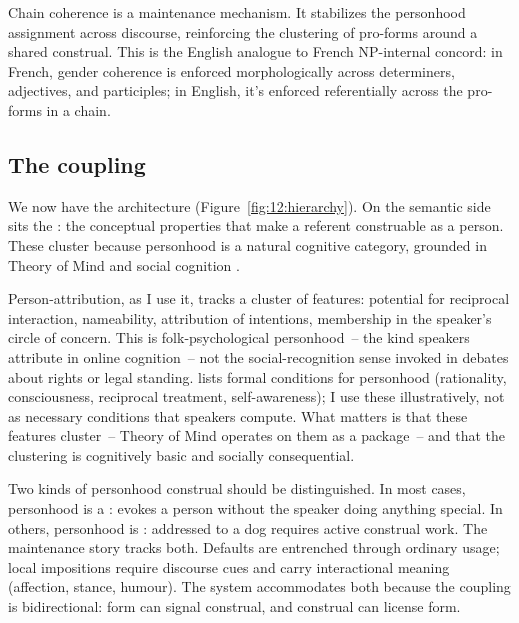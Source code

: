 Chain coherence is a maintenance mechanism. It stabilizes the personhood assignment across discourse, reinforcing the clustering of pro-forms around a shared construal. This is the English analogue to French NP-internal concord: in French, gender coherence is enforced morphologically across determiners, adjectives, and participles; in English, it's enforced referentially across the pro-forms in a chain.

\subsection{The coupling}
\label{sec:12:coupling-subsec}

We now have the architecture (Figure~\ref{fig:12:hierarchy}). On the semantic side sits the : the conceptual properties that make a referent construable as a person. These cluster because personhood is a natural cognitive category, grounded in Theory of Mind and social cognition \autocite{waytz2010}.

Person-attribution, as I use it, tracks a cluster of features: potential for reciprocal interaction, nameability, attribution of intentions, membership in the speaker's circle of concern. This is folk-psychological personhood~-- the kind speakers attribute in online cognition~-- not the social-recognition sense invoked in debates about rights or legal standing. \textcite{dennett1976} lists formal conditions for personhood (rationality, consciousness, reciprocal treatment, self-awareness); I use these illustratively, not as necessary conditions that speakers compute. What matters is that these features cluster~-- Theory of Mind operates on them as a package~-- and that the clustering is cognitively basic and socially consequential.

Two kinds of personhood construal should be distinguished. In most cases, personhood is a :  evokes a person without the speaker doing anything special. In others, personhood is :  addressed to a dog requires active construal work. The maintenance story tracks both. Defaults are entrenched through ordinary usage; local impositions require discourse cues and carry interactional meaning (affection, stance, humour). The system accommodates both because the coupling is bidirectional: form can signal construal, and construal can license form.

